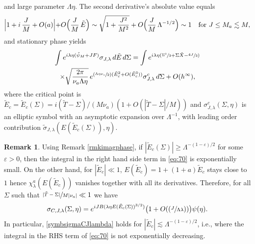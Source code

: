 \documentclass[11pt]{article}
\newcommand{\ie}{i.e.,\xspace}
\newcommand{\Psfrac}[2]{(\sfrac{#1}{#2})}
\let\epsilon\varepsilon
\theoremstyle{plain}
\theoremstyle{definition}
\newtheorem{rmq}{Remark}[section]
\begin{document}
and large parameter $\Lambda\eta$. The second derivative's absolute value equals
\[
\Bigl|1+i\,\frac JM+O(a)\Bigl|+O\Bigl(\frac JM\, {\tilde E}\Bigr)\sim \sqrt{1+\frac{J^2}{M^2}}+O\Bigl(\frac JM\, \Lambda^{-1/2}\Bigr)\sim 1\quad\text{for }J\leq M_a\lesssim M,
\]
and stationary phase yields
\begin{multline}
\label{eq:70}
\int e^{i \lambda\eta (\tilde\psi_{M}+JF)}\sigma_{J,\lambda } \,d{\tilde E} \,d\Sigma = \int e^{i \lambda\eta (\sfrac{\Sigma^3}{3}+\Sigma \tilde X-\sfrac{4J}{3})} \\
\times \sqrt{\frac{2\pi}{\nu_a \Lambda\eta}}\, e^{\Psfrac{\Lambda\eta\nu_a}{2}({\tilde E}^{2}_{c}+O({\tilde E}_{c}^{3}))}\sigma^{c}_{J,\lambda}\,d\Sigma+O(h^{\infty}),
\end{multline}
where the critical point is ${\tilde E}_{c}=\tilde E_c(\Sigma)=i(\tilde T-\Sigma)/(M\nu_a) (1+O(|\tilde T-\Sigma|/M))$ and $\sigma^{c}_{J,\lambda}(\Sigma,\eta)$ is an elliptic symbol with an asymptotic expansion over $\Lambda^{-1}$, with leading order contribution $\tilde \sigma_{J,\lambda}(E(\tilde E_{c}(\Sigma)),\eta)$.

\begin{rmq}\label{rmqsymbC}
Using Remark \ref{rmkimagphase}, if $|\tilde E_c(\Sigma)|\geq \Lambda^{-(1-\epsilon)/2}$ for some $\epsilon>0$, then the integral in the right hand side term in \eqref{eq:70} is exponentially small. On the other hand, for $|\tilde E_c|\ll 1$, $E(\tilde E_c)=1+(1+a)\tilde E_c$ stays close to $1$ hence $\chi^a_{\lambda}(E(\tilde E_c))$ vanishes together with all its derivatives. Therefore, for all $\Sigma$ such that $\sfrac{|\tilde T-\Sigma|}{M|\nu_a|}\ll 1$ we have
\begin{equation}\label{symbsigmaCJlambda}
\sigma_{C,J,\lambda}(\Sigma,\eta)=e^{iJB(\lambda\eta E(\tilde E_c(\Sigma))^{3/2})}\bigl(1+O(\Psfrac{J}{\Lambda\lambda})\bigr)\psi(\eta).
\end{equation}
In particular, \eqref{symbsigmaCJlambda} holds for $|\tilde E_c|\lesssim \Lambda^{-(1-\epsilon)/2}$, \ie where the integral in the RHS term of \eqref{eq:70} is not exponentially decreasing.
\end{rmq}
\end{document}

